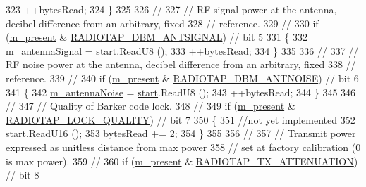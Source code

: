 \begin{DoxyCode}
323       ++bytesRead;
324     \}
325 
326   \textcolor{comment}{//}
327   \textcolor{comment}{// RF signal power at the antenna, decibel difference from an arbitrary, fixed}
328   \textcolor{comment}{// reference.}
329   \textcolor{comment}{//}
330   \textcolor{keywordflow}{if} (\hyperlink{classns3_1_1RadiotapHeader_a8b8aca212245ad4ad1aa796d4cc802bb}{m\_present} & \hyperlink{classns3_1_1RadiotapHeader_afd15dfe66387dfbcbf62865d024f58ffa39a11e0a6b45b0cedcedcaa4adc6a0eb}{RADIOTAP\_DBM\_ANTSIGNAL}) \textcolor{comment}{// bit 5}
331     \{
332       \hyperlink{classns3_1_1RadiotapHeader_a53a38d27f954ad23e3178c5894f91479}{m\_antennaSignal} = \hyperlink{namespacevisualizer_1_1core_a2a35e5d8a34af358b508dac8635754e0}{start}.ReadU8 ();
333       ++bytesRead;
334     \}
335 
336   \textcolor{comment}{//}
337   \textcolor{comment}{// RF noise power at the antenna, decibel difference from an arbitrary, fixed}
338   \textcolor{comment}{// reference.}
339   \textcolor{comment}{//}
340   \textcolor{keywordflow}{if} (\hyperlink{classns3_1_1RadiotapHeader_a8b8aca212245ad4ad1aa796d4cc802bb}{m\_present} & \hyperlink{classns3_1_1RadiotapHeader_afd15dfe66387dfbcbf62865d024f58ffae23bc8a9f7c31fed309f83d9fb47303e}{RADIOTAP\_DBM\_ANTNOISE}) \textcolor{comment}{// bit 6}
341     \{
342       \hyperlink{classns3_1_1RadiotapHeader_aff9eb044c000563934b7b88edad4ef17}{m\_antennaNoise} = \hyperlink{namespacevisualizer_1_1core_a2a35e5d8a34af358b508dac8635754e0}{start}.ReadU8 ();
343       ++bytesRead;
344     \}
345 
346   \textcolor{comment}{//}
347   \textcolor{comment}{// Quality of Barker code lock.}
348   \textcolor{comment}{//}
349   \textcolor{keywordflow}{if} (\hyperlink{classns3_1_1RadiotapHeader_a8b8aca212245ad4ad1aa796d4cc802bb}{m\_present} & \hyperlink{classns3_1_1RadiotapHeader_afd15dfe66387dfbcbf62865d024f58ffaf7e272e231381bb96c1249d3e5bc3f34}{RADIOTAP\_LOCK\_QUALITY}) \textcolor{comment}{// bit 7}
350     \{
351       \textcolor{comment}{//not yet implemented}
352       \hyperlink{namespacevisualizer_1_1core_a2a35e5d8a34af358b508dac8635754e0}{start}.ReadU16 ();
353       bytesRead += 2;
354     \}
355 
356   \textcolor{comment}{//}
357   \textcolor{comment}{// Transmit power expressed as unitless distance from max power}
358   \textcolor{comment}{// set at factory calibration (0 is max power).}
359   \textcolor{comment}{//}
360   \textcolor{keywordflow}{if} (\hyperlink{classns3_1_1RadiotapHeader_a8b8aca212245ad4ad1aa796d4cc802bb}{m\_present} & \hyperlink{classns3_1_1RadiotapHeader_afd15dfe66387dfbcbf62865d024f58ffac37dba53d249adeeb099272e90737893}{RADIOTAP\_TX\_ATTENUATION}) \textcolor{comment}{// bit 8}

\end{DoxyCode}

